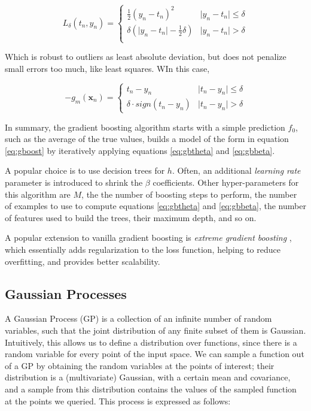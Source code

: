 \documentclass[a4paper]{book}
\begin{document}
\begin{equation}
\label{eq:huberloss}
L_\delta(t_n,y_n)=\begin{cases}
\frac{1}{2}(y_n-t_n)^2 & \vert y_n-t_n \vert \leq \delta \\
\delta(\vert y_n-t_n\vert-\frac{1}{2}\delta) & \vert y_n-t_n \vert > \delta \\
\end{cases}
\end{equation}

Which is robust to outliers as least absolute deviation, but does not penalize small errors too much, like least squares. WIn this case,

\begin{equation}
-g_m(\bm x_n)=\begin{cases}
t_n-y_n & \vert t_n-y_n\vert\leq\delta \\
\delta\cdot sign(t_n-y_n) & \vert t_n-y_n\vert>\delta
\end{cases}
\end{equation}

In summary, the gradient boosting algorithm starts with a simple prediction $f_0$, such as the average of the true values, builds a model of the form in equation \ref{eq:gboost} by iteratively applying equations \ref{eq:gbtheta} and \ref{eq:gbbeta}.

A popular choice is to use decision trees for $h$. Often, an additional \emph{learning rate} parameter is introduced to shrink the $\beta$ coefficients. Other hyper-parameters for this algorithm are $M$, the the number of boosting steps to perform, the number of examples to use to compute equations \ref{eq:gbtheta} and \ref{eq:gbbeta}, the number of features used to build the trees, their maximum depth, and so on.

A popular extension to vanilla gradient boosting is \emph{extreme gradient boosting} \citep{xgboost}, which essentially adds regularization to the loss function, helping to reduce overfitting, and provides better scalability.

\subsection{Gaussian Processes}
A Gaussian Process (GP) is a collection of an infinite number of random variables, such that the joint distribution of any finite subset of them is Gaussian. Intuitively, this allows us to define a distribution over functions, since there is a random variable for every point of the input space. We can sample a function out of a GP by obtaining the random variables at the points of interest; their distribution is a (multivariate) Gaussian, with a certain mean and covariance, and a sample from this distribution contains the values of the sampled function at the points we queried. This process is expressed as follows:
\end{document}
